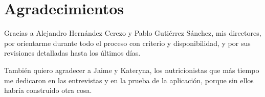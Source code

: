
\chapter*{Agradecimientos}

Gracias a Alejandro Hernández Cerezo y Pablo Gutiérrez Sánchez, mis directores, por orientarme durante todo el proceso con criterio y disponibilidad, y por sus revisiones detalladas hasta los últimos días.

También quiero agradecer a Jaime y Kateryna, los nutricionistas que más tiempo me dedicaron en las entrevistas y en la prueba de la aplicación, porque sin ellos habría construido otra cosa.
